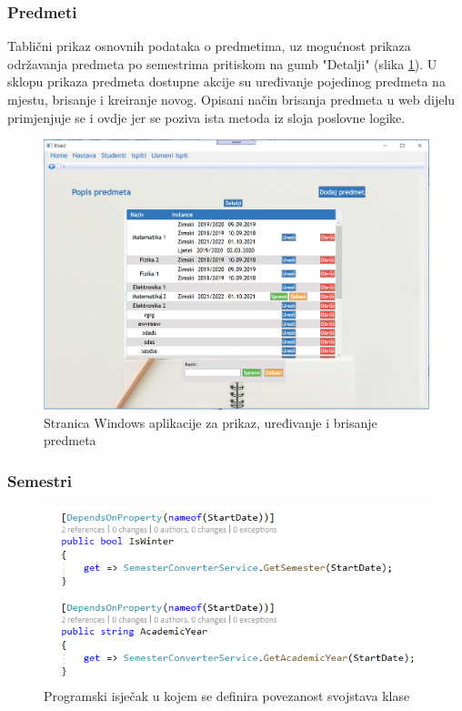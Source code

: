 \documentclass[times, utf8, diplomski]{fer}
\begin{document}
\subsubsection{Predmeti}
Tablični prikaz osnovnih podataka o predmetima, uz mogućnost prikaza održavanja predmeta po semestrima pritiskom na gumb "Detalji" (slika \ref{fig:courses}). U sklopu prikaza predmeta dostupne akcije su uređivanje pojedinog predmeta na mjestu, brisanje i kreiranje novog. Opisani način brisanja predmeta u web dijelu primjenjuje se i ovdje jer se poziva ista metoda iz sloja poslovne logike.  
\begin{figure}[htb]
\centering
\includegraphics[width=12cm]{courses.PNG}
\caption{Stranica Windows aplikacije za prikaz, uređivanje i brisanje predmeta}
\label{fig:courses}
\end{figure}

\subsubsection{Semestri}

\begin{figure}[htb]
\centering
\includegraphics[width=12cm]{semester_depends.PNG}
\caption{Programski isječak u kojem se definira povezanost svojstava klase}
\label{fig:semester_depends}
\end{figure}
\end{document}
